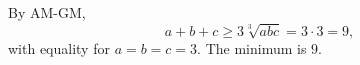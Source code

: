 By AM-GM,
\[
a+b+c\ge3\sqrt[3]{abc}=3\cdot3=9,
\]
with equality for $a=b=c=3$. The minimum is $\boxed{9}$.
